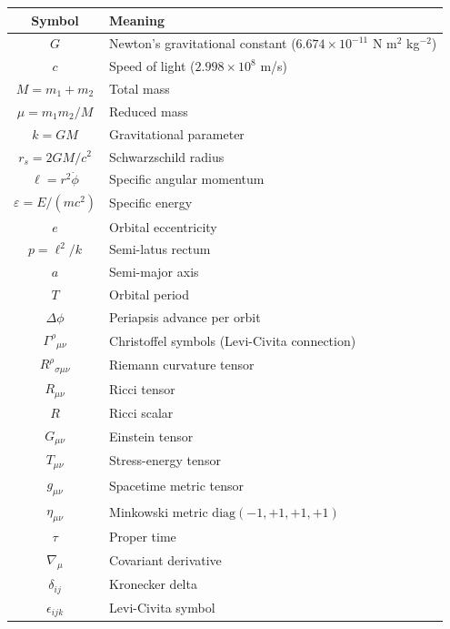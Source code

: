 \documentclass[12pt,a4paper]{article}
\theoremstyle{plain}
\theoremstyle{definition}
\theoremstyle{remark}
\newcommand{\leff}{\ell}  %
\begin{document}
\begin{table}[h]
\centering
\begin{tabular}{cl}
  \toprule
  Symbol & Meaning \\
  \midrule
  $G$ & Newton's gravitational constant ($6.674\times10^{-11}$ N m$^2$ kg$^{-2}$) \\
  $c$ & Speed of light ($2.998\times10^8$ m/s) \\
  $M=m_1+m_2$ & Total mass \\
  $\mu=m_1m_2/M$ & Reduced mass \\
  $k=GM$ & Gravitational parameter \\
  $r_s=2GM/c^2$ & Schwarzschild radius \\
  $\leff=r^2\dot\phi$ & Specific angular momentum \\
  $\varepsilon=E/(mc^2)$ & Specific energy \\
  $e$ & Orbital eccentricity \\
  $p=\leff^2/k$ & Semi-latus rectum \\
  $a$ & Semi-major axis \\
  $T$ & Orbital period \\
  $\Delta\phi$ & Periapsis advance per orbit \\
  $\Gamma^\rho{}_{\mu\nu}$ & Christoffel symbols (Levi-Civita connection) \\
  $R^\rho{}_{\sigma\mu\nu}$ & Riemann curvature tensor \\
  $R_{\mu\nu}$ & Ricci tensor \\
  $R$ & Ricci scalar \\
  $G_{\mu\nu}$ & Einstein tensor \\
  $T_{\mu\nu}$ & Stress-energy tensor \\
  $g_{\mu\nu}$ & Spacetime metric tensor \\
  $\eta_{\mu\nu}$ & Minkowski metric $\mathrm{diag}(-1,+1,+1,+1)$ \\
  $\tau$ & Proper time \\
  $\nabla_\mu$ & Covariant derivative \\
  $\delta_{ij}$ & Kronecker delta \\
  $\epsilon_{ijk}$ & Levi-Civita symbol \\
  \bottomrule
\end{tabular}
\end{table}
\end{document}
